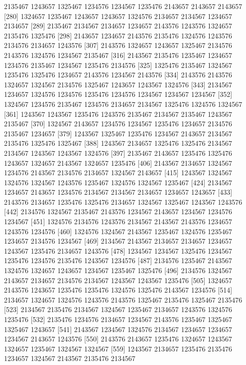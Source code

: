 \documentclass{scrartcl}
\begin{document}
\begin{Schunk}
\begin{Soutput}
 [271] 2135467 1243657 1325467 1234576 1234567 1235476 2143657 2143657 2143657
 [280] 1324657 1235467 1243657 1243657 1324576 2134657 2134567 1234657 2134657
 [289] 2135467 2134567 2134657 1234657 2143576 1243576 1324657 2135476 1325476
 [298] 2143657 1234657 2143576 2135476 1324576 1243576 2134576 2134657 1243576
 [307] 2143576 1324657 1243657 1325467 2134576 2143576 1324576 1234567 2135467
 [316] 2143567 2135476 1235467 1234657 1234576 2135467 1234567 1235476 2134576
 [325] 1325476 2135467 1324567 1235476 1325476 1234657 2143576 1234567 2143576
 [334] 2143576 2143576 1324657 1324567 2134576 1325467 1243657 1243567 1324576
 [343] 2134567 1234657 1324576 1234576 1235476 1234576 1234567 1234567 1234567
 [352] 1324567 1234576 2135467 1234576 2134657 2134567 1325476 1324576 1324567
 [361] 1243567 1243567 1235476 1243576 2135467 2134567 2135467 1243567 2135467
 [370] 1324567 2143657 1234576 1234567 1235476 1234657 2134576 2135467 1234657
 [379] 1243567 1325467 1235476 1234567 2143657 2134567 2135476 1325476 1325467
 [388] 1243567 2134657 1325476 1325476 2134567 2134567 1243567 1243567 1324576
 [397] 2135467 2143657 1235476 1325476 1243657 1324657 2143567 1324657 1235476
 [406] 2143567 2134657 1324567 1234576 2143567 2134576 2134657 1324567 2143657
 [415] 1243567 1324567 1324576 1324567 1243576 1235467 1324576 1324567 1235467
 [424] 2134567 1234657 2143657 1234576 2134567 2134567 2134657 1234657 1243657
 [433] 2143576 2134657 1235476 1325476 2134657 1324567 1325467 1243567 1243576
 [442] 2134576 1324567 2135467 2143576 1234567 2143657 1234567 1234576 1234567
 [451] 1324576 2134576 1243576 2134567 2143567 2143576 1234657 1243576 1234576
 [460] 1324576 1324567 2143567 1235467 1324576 1235467 1234657 2134576 1234567
 [469] 2134567 2143567 2134657 2134657 1234657 1243567 1235476 2134657 1243576
 [478] 1234567 1234567 1325476 1234567 1235476 1234576 2135476 1243567 1234576
 [487] 2134576 1235467 2143567 1324576 1324657 1243657 1234567 1235467 1325476
 [496] 2134576 1324567 2143657 2134657 2134576 2134567 1243567 1243567 1235476
 [505] 1324657 2143576 1243657 1235476 1235476 1324576 1325476 2143567 1234576
 [514] 2134657 1324657 1324576 1243576 2143576 1325467 2135476 1325467 2135476
 [523] 2134567 2135476 2134567 1324567 1235467 2134657 1243576 1324576 1235476
 [532] 2135476 1234576 2134657 1234567 2143576 1235467 1325467 1325467 1243657
 [541] 2143567 1234567 1324576 2134567 1234657 1234657 1234567 2143657 1243576
 [550] 2143576 2143657 1235476 1324657 1243567 1324657 1235467 1324567 1324567
 [559] 1243567 2134657 1235476 2135476 1234657 1324567 2143567 2135476 2134567

\end{Soutput}
\end{Schunk}
\end{document}
